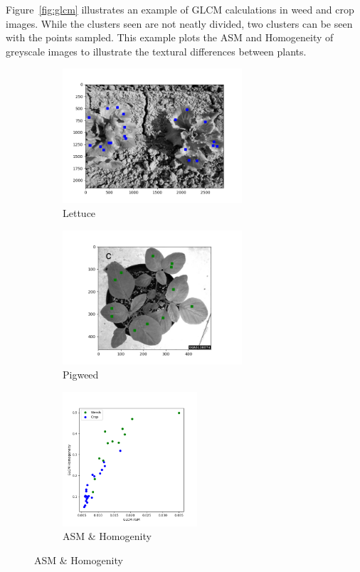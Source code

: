 \documentclass[letterpaper]{report}
\begin{document}
Figure~\ref{fig:glcm} illustrates an example of GLCM calculations in weed and crop images. While the clusters seen are not neatly divided, two clusters can be seen with the points sampled. This example plots the ASM and Homogeneity of greyscale images to illustrate the textural differences between plants.

\begin{figure}[H]
	\begin{subfigure}[h]{0.28\linewidth}
		\includegraphics[height=5cm]{./figures/glcm-crop.png}
		\caption{Lettuce}
		\label{subfig:glcm_crop}	
	\end{subfigure}
	\hfill
	\begin{subfigure}[h]{0.28\linewidth}
		\includegraphics[height=5cm]{./figures/glcm-weed.png}
		\caption{Pigweed}
		\label{subfig:glcm_weed}		
	\end{subfigure}%
	\hfill
	\begin{subfigure}[h]{0.28\linewidth}
		\includegraphics[height=5cm]{./figures/glcm-plot.png}
		\caption{ASM \& Homogenity}
		\label{subfig:glcm_plot}		

\end{subfigure}
\end{figure}
\end{document}
